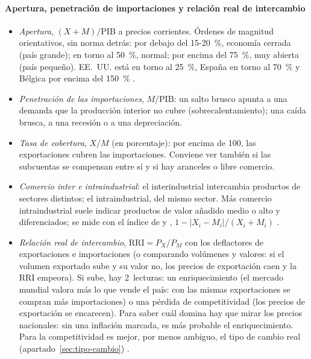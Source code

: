 \documentclass[11pt]{article}
\begin{document}
\paragraph{Apertura, penetración de importaciones y relación real de intercambio}
\begin{itemize}
\item \emph{Apertura}, $(X+M)/\mathrm{PIB}$ a precios corrientes. Órdenes de magnitud orientativos, sin norma detrás: por debajo del 15-20~\%, economía cerrada (país grande); en torno al 50~\%, normal; por encima del 75~\%, muy abierta (país pequeño). EE.~UU. está en torno al 25~\%, España en torno al 70~\% y Bélgica por encima del 150~\% \parencite{Eurostat2026nama10gdp,BM2026WDI} .
\item \emph{Penetración de las importaciones}, $M/\mathrm{PIB}$: un salto brusco apunta a una demanda que la producción interior no cubre (sobrecalentamiento); una caída brusca, a una recesión o a una depreciación.
\item \emph{Tasa de cobertura}, $X/M$ (en porcentaje): por encima de 100, las exportaciones cubren las importaciones. Conviene ver también si las subcuentas se compensan entre sí y si hay aranceles o libre comercio.
\item \emph{Comercio inter e intraindustrial}: el interindustrial intercambia productos de sectores distintos; el intraindustrial, del mismo sector. Más comercio intraindustrial suele indicar productos de valor añadido medio o alto y diferenciados; se mide con el índice de  y , $1-|X_i-M_i|/(X_i+M_i)$ \parencite{GrubelLloyd1975} .
\item \emph{Relación real de intercambio}, $\mathrm{RRI}=P_X/P_M$ con los deflactores de exportaciones e importaciones (o comparando volúmenes y valores: si el volumen exportado sube y su valor no, los precios de exportación caen y la RRI empeora). Si sube, hay 2~lecturas: un enriquecimiento (el mercado mundial valora más lo que vende el país: con las mismas exportaciones se compran más importaciones) o una pérdida de competitividad (los precios de exportación se encarecen). Para saber cuál domina hay que mirar los precios nacionales: sin una inflación marcada, es más probable el enriquecimiento. Para la competitividad es mejor, por menos ambiguo, el tipo de cambio real (apartado~\ref{sec:tipo-cambio}) .
\end{itemize}
\end{document}
